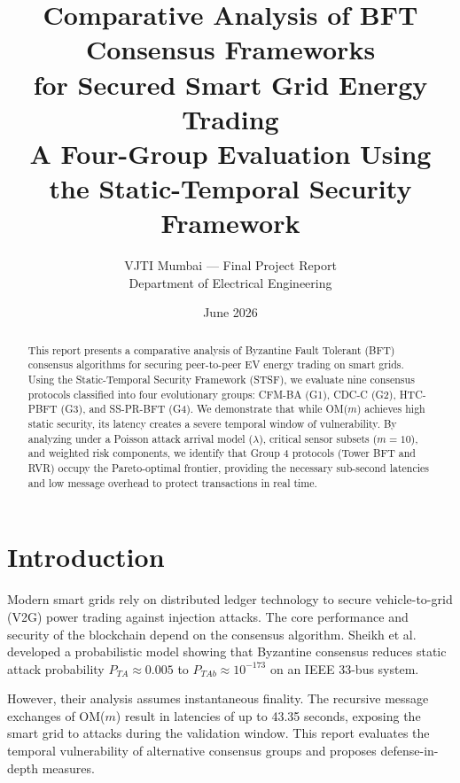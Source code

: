 \documentclass[10pt,twocolumn,letterpaper]{article}
\title{\textbf{Comparative Analysis of BFT Consensus Frameworks\\for Secured Smart Grid Energy Trading}\\[6pt]
\large A Four-Group Evaluation Using the Static-Temporal Security Framework\\[4pt]}
\author{%
VJTI Mumbai --- Final Project Report\\
Department of Electrical Engineering
}
\date{June 2026}
\begin{document}
\maketitle

\begin{abstract}
This report presents a comparative analysis of Byzantine Fault Tolerant (BFT) consensus algorithms for securing peer-to-peer EV energy trading on smart grids. Using the Static-Temporal Security Framework (STSF), we evaluate nine consensus protocols classified into four evolutionary groups: CFM-BA (G1), CDC-C (G2), HTC-PBFT (G3), and SS-PR-BFT (G4). We demonstrate that while OM($m$) achieves high static security, its latency creates a severe temporal window of vulnerability. By analyzing under a Poisson attack arrival model ($\lambda$), critical sensor subsets ($m=10$), and weighted risk components, we identify that Group 4 protocols (Tower BFT and RVR) occupy the Pareto-optimal frontier, providing the necessary sub-second latencies and low message overhead to protect transactions in real time.
\end{abstract}

\section{Introduction}
Modern smart grids rely on distributed ledger technology to secure vehicle-to-grid (V2G) power trading against injection attacks. The core performance and security of the blockchain depend on the consensus algorithm. Sheikh et al.~\cite{sheikh2020} developed a probabilistic model showing that Byzantine consensus reduces static attack probability $P_{TA} \approx 0.005$ to $P_{TAb} \approx 10^{-173}$ on an IEEE 33-bus system.

However, their analysis assumes instantaneous finality. The recursive message exchanges of OM($m$) result in latencies of up to 43.35 seconds, exposing the smart grid to attacks during the validation window. This report evaluates the temporal vulnerability of alternative consensus groups and proposes defense-in-depth measures.
\end{document}
